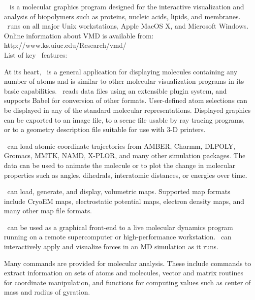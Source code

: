 \VMD~\cite{HUMP96} is a molecular graphics program designed for the
interactive visualization and analysis of biopolymers such as proteins,
nucleic acids, lipids, and membranes.  \VMD\ runs on all major 
Unix workstations, Apple MacOS X, and Microsoft Windows.
Online information about VMD is available from:
\\ 
		   {http://www.ks.uiuc.edu/Research/vmd/}
\vspace{0.1in}
\\
List of key \VMD\ features:
\begin{itemize}
   At its heart, \VMD\
is a general application for displaying molecules containing
any number of atoms and is similar to other molecular visualization 
programs in its basic capabilities.
\VMD\ reads data files using an extensible plugin system, and supports
Babel\mycite{}{} for conversion of other formats.
User-defined atom selections can be displayed in any of the
standard molecular representations.
Displayed graphics can be exported to an image file, 
to a scene file usable by ray tracing programs, or to
a geometry description file suitable for use with 3-D printers.

\VMD\ can load atomic coordinate trajectories from 
AMBER, Charmm, DLPOLY, Gromacs, MMTK, NAMD, X-PLOR, and many other 
simulation packages.  The data can be used to animate the molecule or 
to plot the change in molecular properties such as angles, dihedrals, 
interatomic distances, or energies over time.

\VMD\ can load, generate, and display, volumetric maps.  Supported
map formats include CryoEM maps, electrostatic potential maps, 
electron density maps, and many other map file formats.

\VMD\ can be used as a graphical front-end to a live molecular
dynamics program running on a remote supercomputer or
high-performance workstation.  \VMD\ can interactively apply
and visualize forces in an MD simulation as it runs.

Many commands are provided for molecular analysis.  
These include commands to extract information on sets of atoms and molecules, 
vector and matrix routines for coordinate manipulation, and 
functions for computing values such as center of mass and radius 
of gyration.


\end{itemize}
